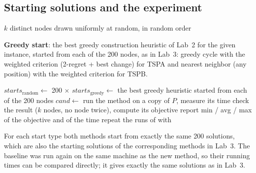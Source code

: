 \documentclass[11pt,a4paper]{article}
\begin{document}
\subsection*{Starting solutions and the experiment}
\begin{algorithm}[H]
\caption{Random solution}
\begin{algorithmic}[1]
  \State \Return $k$ distinct nodes drawn uniformly at random, in random order
\EndFunction
\end{algorithmic}
\end{algorithm}

\textbf{Greedy start}: the best greedy construction heuristic of Lab~2 for the given instance, started
from each of the 200 nodes, as in Lab~3: greedy cycle with the weighted criterion (2-regret + best
change) for TSPA and nearest neighbor (any position) with the weighted criterion for TSPB.

\begin{algorithm}[H]
\caption{Computational experiment (for each instance)}
\begin{algorithmic}[1]
\State $\mathit{starts}_{\mathrm{random}} \gets$ 200 $\times$  
\State $\mathit{starts}_{\mathrm{greedy}} \gets$ the best greedy heuristic started from each of the 200 nodes
\State $\mathit{cand} \gets$ 
      \State run the method on a copy of $P$, measure its time
      \State check the result ($k$ nodes, no node twice), compute its objective
    \EndFor
    \State report min / avg / max of the objective and of the time
  \EndFor
\EndFor
{} 
  \State repeat the runs of  with 
\EndFor
\end{algorithmic}
\end{algorithm}
For each start type both methods start from exactly the same 200 solutions, which are also the
starting solutions of the corresponding methods in Lab~3. The baseline was run again on the same
machine as the new method, so their running times can be compared directly; it gives exactly the
same solutions as in Lab~3.
\end{document}
